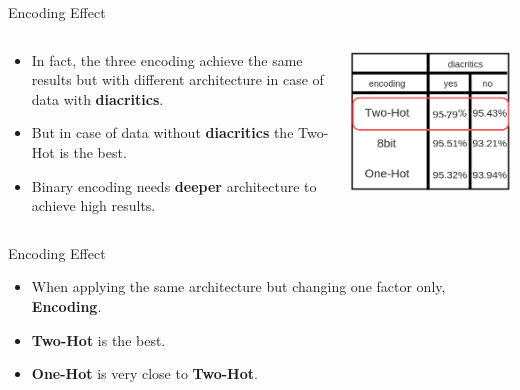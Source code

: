 \documentclass[10pt]{beamer}
\begin{document}
\begin{frame}[fragile]{Encoding Effect}
\begin{columns}
\begin{column}{0.5\textwidth}
\begin{itemize}
    \item In fact, the three encoding achieve the same results but with
different architecture in case of data with \textbf{diacritics}.
    \item But in case of data without \textbf{diacritics} the Two-Hot is the best.
    \item Binary encoding needs \textbf{deeper} architecture to achieve high results.
\end{itemize}
\end{column}
\begin{column}{0.5\textwidth}
\includegraphics[scale=0.4]{fig6.png}
\end{column}
\end{columns}
\end{frame}






\begin{frame}[fragile]{Encoding Effect}

\begin{itemize}
    \item When applying the same architecture but changing one factor only, \textbf{Encoding}.
    \item \textbf{Two-Hot} is the best.
    \item \textbf{One-Hot} is very close to \textbf{Two-Hot}.
\end{itemize}

\begin{center}

\end{center}
\end{frame}
\end{document}
